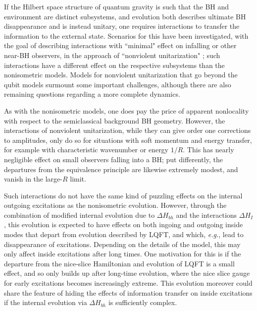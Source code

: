 \documentclass[12pt]{article}
\numberwithin{equation}{section}
\begin{document}
If the Hilbert space structure of quantum gravity is such that the BH and environment are distinct subsystems, and evolution both describes ultimate BH disappearance and is instead unitary, one requires\cite{BHthm} interactions to transfer the information to the external state.  Scenarios for this have been investigated, with the goal of describing interactions with ``minimal" effect on infalling or other near-BH observers, in the approach of 
``nonviolent unitarization" \cite{SGmodels,NVU,NVNL,NVUEFT,NVNLT,BHQU};
such interactions have a different effect on the respective subsystems than the nonisometric models.  
Models for nonviolent unitarization that go beyond the qubit models surmount some important challenges, although there are also remaining questions regarding a more complete dynamics.  

As with the nonisometric models, one does pay the price of apparent nonlocality with respect to the semiclassical background BH geometry.  However, the interactions of nonviolent unitarization, while they can give order one corrections to amplitudes, only do so for situations with soft momentum and energy transfer, for example with characteristic wavenumber or energy $1/R$.  This has nearly negligible effect on small observers falling into a BH; put differently, the departures from the equivalence principle are likewise extremely modest, and vanish in the large-$R$ limit.

Such interactions do not have the same kind of puzzling effects on the internal outgoing excitations as the nonisometric evolution.  However, through the combination of modified internal evolution due to $\Delta H_{bh}$ and the interactions $\Delta H_I$, this evolution is expected to have effects on  both ingoing and outgoing inside modes that depart from evolution described by LQFT, and which, {\it e.g.}, lead to disappearance of excitations.  Depending on the details of the model, this may only affect inside excitations after long times.  One motivation for this is if the departure from the nice-slice Hamiltonian and evolution of LQFT is a small effect, and so only builds up after long-time evolution, where the nice slice gauge for early excitations becomes increasingly extreme.
This evolution moreover could share the feature of hiding the effects of information transfer\cite{AEHPV} on inside excitations if the internal evolution via $\Delta H_{bh}$ is sufficiently complex.   
\end{document}
